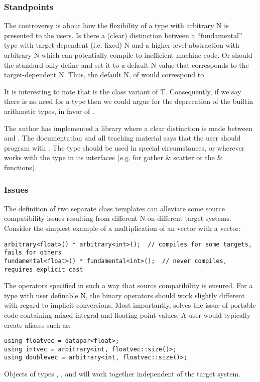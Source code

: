 \subsubsection{Standpoints}
The controversy is about how the flexibility of a type with arbitrary \code N is presented to the users.
Is there a (clear) distinction between a “fundamental” type with target-dependent (i.e. fixed) \code N and a higher-level abstraction with arbitrary \code N which can potentially compile to inefficient machine code.
Or should the \CC{} standard only define  and set it to a default \code N value that corresponds to the target-dependent \code N.
Thus, the default \code N, of  would correspond to .

It is interesting to note that  is the class variant of \type T.
Consequently, if we say there is no need for a  type then we could argue for the deprecation of the builtin arithmetic types, in favor of . 

The author has implemented a library where a clear distinction is made between  and .
The documentation and all teaching material says that the user should program with .
The  type should be used in special circumstances, or wherever  works with the  type in its interfaces (e.g. for gather \& scatter or the  \&  functions).

\subsubsection{Issues}
The definition of two separate class templates can alleviate some source compatibility issues resulting from different \code N on different target systems.
Consider the simplest example of a multiplication of an \intt vector with a \float vector:
\smallskip\begin{lstlisting}[style=Vc]
arbitrary<float>() * arbitrary<int>();  // compiles for some targets, fails for others
fundamental<float>() * fundamental<int>();  // never compiles, requires explicit cast
\end{lstlisting}
The \datapar[<T>] operators specified in such a way that source compatibility is ensured.
For a type with user definable \code N, the binary operators should work slightly different with regard to implicit conversions.
Most importantly,  solves the issue of portable code containing mixed integral and floating-point values.
A user would typically create aliases such as:
\smallskip\begin{lstlisting}[style=Vc]
using floatvec = datapar<float>;
using intvec = arbitrary<int, floatvec::size()>;
using doublevec = arbitrary<int, floatvec::size()>;
\end{lstlisting}
Objects of types , , and  will work together independent of the target system.

